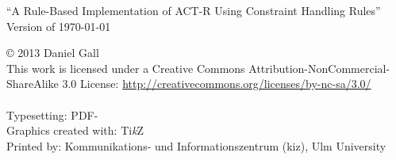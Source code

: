 \documentclass[
    a4paper,
    10pt,
    bibliography=totoc,
    twoside,
    openright,
    numbers=noenddot,
    headings=normal,
    DIV=9,
    BCOR=7mm
    ,parskip
]{scrbook}
\newcommand{\fullname}{Daniel Gall}
\newcommand{\titel}{A Rule-Based Implementation of ACT-R Using Constraint Handling Rules}
\newcommand{\jahr}{2013}
\newcommand{\arbeit}{Masterarbeit}
\newcommand{\FIXME}[1]{} %
\begin{document}
\clearpage
\thispagestyle{empty}
{
    \small \flushleft \enquote{\titel}\\
    Version of \today
    \vfill



    \copyright{} \jahr{} \fullname{}\\[0.5em]
    This work is licensed under a Creative Commons Attribution-NonCommercial-ShareAlike 3.0 License: \url{http://creativecommons.org/licenses/by-nc-sa/3.0/}\\
    \ccbyncsa\\
    \vspace{0.5cm}
    Typesetting: PDF-\LaTeXe{}\\
    Graphics created with: Ti\textit{k}Z\\
    Printed by: Kommunikations- und Informationszentrum (kiz), Ulm University
}
\end{document}
